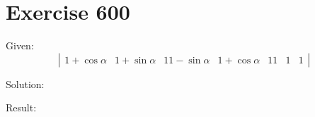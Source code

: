 \documentclass[a4paper, 10pt]{scrartcl}
\begin{document}
\section{Exercise 600}

Given:
\[
\left|
    \begin{array}{ccc}
        1 + \cos{\alpha} & 1 + \sin{\alpha} & 1
        1 - \sin{\alpha} & 1 + \cos{\alpha} & 1
        1 & 1 & 1
    \end{array}
\right|
\]

Solution:

Result:
\end{document}
